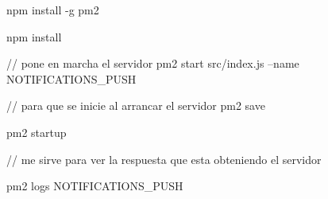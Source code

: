 npm install -g pm2


npm install


// pone en marcha el servidor
pm2 start src/index.js --name NOTIFICATIONS_PUSH


// para que se inicie al arrancar el servidor
pm2 save


pm2 startup

// me sirve para ver la respuesta que esta obteniendo el servidor 

pm2 logs NOTIFICATIONS_PUSH 

